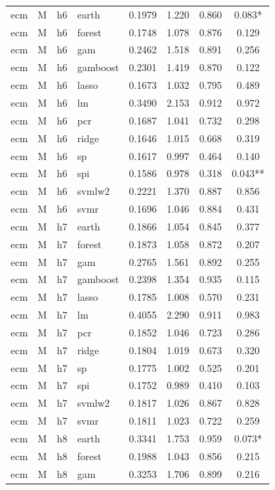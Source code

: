 \begin{ThreePartTable}
\begin{longtable}[t]{llclcccc}
\addlinespace
ecm & M & h6 & earth & 0.1979 & 1.220 & 0.860 & 0.083*\\
ecm & M & h6 & forest & 0.1748 & 1.078 & 0.876 & 0.129\\
ecm & M & h6 & gam & 0.2462 & 1.518 & 0.891 & 0.256\\
ecm & M & h6 & gamboost & 0.2301 & 1.419 & 0.870 & 0.122\\
ecm & M & h6 & lasso & 0.1673 & 1.032 & 0.795 & 0.489\\
ecm & M & h6 & lm & 0.3490 & 2.153 & 0.912 & 0.972\\
ecm & M & h6 & pcr & 0.1687 & 1.041 & 0.732 & 0.298\\
ecm & M & h6 & ridge & 0.1646 & 1.015 & 0.668 & 0.319\\
ecm & M & h6 & sp & 0.1617 & 0.997 & 0.464 & 0.140\\
ecm & M & h6 & spi & 0.1586 & 0.978 & 0.318 & 0.043**\\
ecm & M & h6 & svmlw2 & 0.2221 & 1.370 & 0.887 & 0.856\\
ecm & M & h6 & svmr & 0.1696 & 1.046 & 0.884 & 0.431\\
\addlinespace
ecm & M & h7 & earth & 0.1866 & 1.054 & 0.845 & 0.377\\
ecm & M & h7 & forest & 0.1873 & 1.058 & 0.872 & 0.207\\
ecm & M & h7 & gam & 0.2765 & 1.561 & 0.892 & 0.255\\
ecm & M & h7 & gamboost & 0.2398 & 1.354 & 0.935 & 0.115\\
ecm & M & h7 & lasso & 0.1785 & 1.008 & 0.570 & 0.231\\
ecm & M & h7 & lm & 0.4055 & 2.290 & 0.911 & 0.983\\
ecm & M & h7 & pcr & 0.1852 & 1.046 & 0.723 & 0.286\\
ecm & M & h7 & ridge & 0.1804 & 1.019 & 0.673 & 0.320\\
ecm & M & h7 & sp & 0.1775 & 1.002 & 0.525 & 0.201\\
ecm & M & h7 & spi & 0.1752 & 0.989 & 0.410 & 0.103\\
ecm & M & h7 & svmlw2 & 0.1817 & 1.026 & 0.867 & 0.828\\
ecm & M & h7 & svmr & 0.1811 & 1.023 & 0.722 & 0.259\\
\addlinespace
ecm & M & h8 & earth & 0.3341 & 1.753 & 0.959 & 0.073*\\
ecm & M & h8 & forest & 0.1988 & 1.043 & 0.856 & 0.215\\
ecm & M & h8 & gam & 0.3253 & 1.706 & 0.899 & 0.216\\

\end{longtable}
\end{ThreePartTable}
